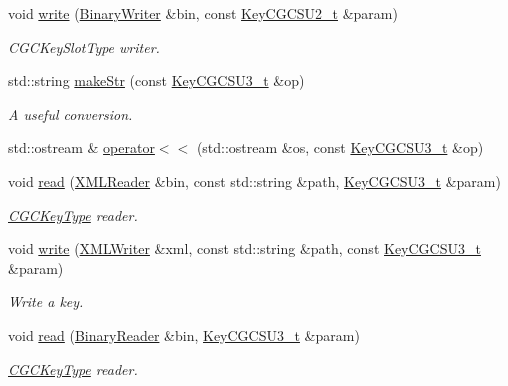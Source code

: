 \begin{DoxyCompactItemize}
void \mbox{\hyperlink{namespaceHadron_aeadf04c31606521c48ee674d28e2ca3e}{write}} (\mbox{\hyperlink{classADATIO_1_1BinaryWriter}{Binary\+Writer}} \&bin, const \mbox{\hyperlink{structHadron_1_1KeyCGCSU2__t}{Key\+C\+G\+C\+S\+U2\+\_\+t}} \&param)
\begin{DoxyCompactList}\small\item\em C\+G\+C\+Key\+Slot\+Type writer. \end{DoxyCompactList}\item 
std\+::string \mbox{\hyperlink{namespaceHadron_a15300efff4b5c521fc84ba05f78c8710}{make\+Str}} (const \mbox{\hyperlink{structHadron_1_1KeyCGCSU3__t}{Key\+C\+G\+C\+S\+U3\+\_\+t}} \&op)
\begin{DoxyCompactList}\small\item\em A useful conversion. \end{DoxyCompactList}\item 
std\+::ostream \& \mbox{\hyperlink{namespaceHadron_a7351a4ec8398497cfa72ae6326e7d88c}{operator$<$$<$}} (std\+::ostream \&os, const \mbox{\hyperlink{structHadron_1_1KeyCGCSU3__t}{Key\+C\+G\+C\+S\+U3\+\_\+t}} \&op)
\item 
void \mbox{\hyperlink{namespaceHadron_a32f04cfa14604e9b40e037d78c0fad86}{read}} (\mbox{\hyperlink{classADATXML_1_1XMLReader}{X\+M\+L\+Reader}} \&bin, const std\+::string \&path, \mbox{\hyperlink{structHadron_1_1KeyCGCSU3__t}{Key\+C\+G\+C\+S\+U3\+\_\+t}} \&param)
\begin{DoxyCompactList}\small\item\em \mbox{\hyperlink{structHadron_1_1CGCKeyType}{C\+G\+C\+Key\+Type}} reader. \end{DoxyCompactList}\item 
void \mbox{\hyperlink{namespaceHadron_a1df6238e1c6eca70a3e05655f2680904}{write}} (\mbox{\hyperlink{classADATXML_1_1XMLWriter}{X\+M\+L\+Writer}} \&xml, const std\+::string \&path, const \mbox{\hyperlink{structHadron_1_1KeyCGCSU3__t}{Key\+C\+G\+C\+S\+U3\+\_\+t}} \&param)
\begin{DoxyCompactList}\small\item\em Write a key. \end{DoxyCompactList}\item 
void \mbox{\hyperlink{namespaceHadron_ad89b4230ad913b777ca725473df40d15}{read}} (\mbox{\hyperlink{classADATIO_1_1BinaryReader}{Binary\+Reader}} \&bin, \mbox{\hyperlink{structHadron_1_1KeyCGCSU3__t}{Key\+C\+G\+C\+S\+U3\+\_\+t}} \&param)
\begin{DoxyCompactList}\small\item\em \mbox{\hyperlink{structHadron_1_1CGCKeyType}{C\+G\+C\+Key\+Type}} reader. \end{DoxyCompactList}\item 

\end{DoxyCompactItemize}
